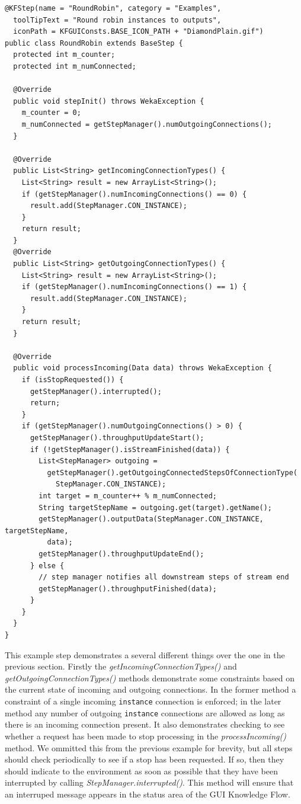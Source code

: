 \begin{verbatim}
@KFStep(name = "RoundRobin", category = "Examples",
  toolTipText = "Round robin instances to outputs",
  iconPath = KFGUIConsts.BASE_ICON_PATH + "DiamondPlain.gif")
public class RoundRobin extends BaseStep {
  protected int m_counter;
  protected int m_numConnected;

  @Override
  public void stepInit() throws WekaException {
    m_counter = 0;
    m_numConnected = getStepManager().numOutgoingConnections();
  }

  @Override
  public List<String> getIncomingConnectionTypes() {
    List<String> result = new ArrayList<String>();
    if (getStepManager().numIncomingConnections() == 0) {
      result.add(StepManager.CON_INSTANCE);
    }
    return result;
  }
  @Override
  public List<String> getOutgoingConnectionTypes() {
    List<String> result = new ArrayList<String>();
    if (getStepManager().numIncomingConnections() == 1) {
      result.add(StepManager.CON_INSTANCE);
    }
    return result;
  }

  @Override
  public void processIncoming(Data data) throws WekaException {
    if (isStopRequested()) {
      getStepManager().interrupted();
      return;
    }
    if (getStepManager().numOutgoingConnections() > 0) {
      getStepManager().throughputUpdateStart();
      if (!getStepManager().isStreamFinished(data)) {
        List<StepManager> outgoing =
          getStepManager().getOutgoingConnectedStepsOfConnectionType(
            StepManager.CON_INSTANCE);
        int target = m_counter++ % m_numConnected;
        String targetStepName = outgoing.get(target).getName();
        getStepManager().outputData(StepManager.CON_INSTANCE, targetStepName,
          data);
        getStepManager().throughputUpdateEnd();
      } else {
        // step manager notifies all downstream steps of stream end
        getStepManager().throughputFinished(data);
      }
    }
  }
}
\end{verbatim}
\newpage

This example step demonstrates a several different things over the one
in the previous section. Firstly the
\textit{getIncomingConnectionTypes()} and
\textit{getOutgoingConnectionTypes()} methods demonstrate some
constraints based on the current state of incoming and outgoing
connections. In the former method a constraint of a single incoming
\verb=instance= connection is enforced; in the later method any number
of outgoing \verb=instance= connections are allowed as long as there
is an incoming connection present. It also demonstrates checking to
see whether a request has been made to stop processing in the
\textit{processIncoming()} method. We ommitted this from the previous
example for brevity, but all steps should check periodically to see if
a stop has been requested. If so, then they should indicate to the
environment as soon as possible that they have been interrupted by
calling \textit{StepManager.interrupted()}. This method will ensure
that an interruped message appears in the status area of the GUI
Knowledge Flow.

